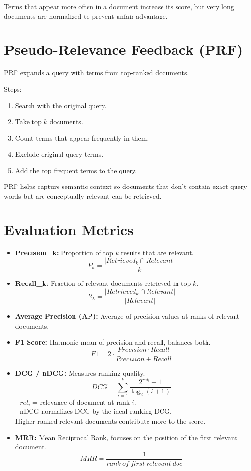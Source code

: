 \documentclass[a4paper,12pt]{article}
\begin{document}
Terms that appear more often in a document increase its score, but very long documents are normalized to prevent unfair advantage.

\section{Pseudo-Relevance Feedback (PRF)}
PRF expands a query with terms from top-ranked documents.

Steps:
\begin{enumerate}
    \item Search with the original query.
    \item Take top $k$ documents.
    \item Count terms that appear frequently in them.
    \item Exclude original query terms.
    \item Add the top frequent terms to the query.
\end{enumerate}

PRF helps capture semantic context so documents that don't contain exact query words but are conceptually relevant can be retrieved.

\section{Evaluation Metrics}
\begin{itemize}
    \item \textbf{Precision\_k:} Proportion of top $k$ results that are relevant.
    \[
    P_k = \frac{|Retrieved_k \cap Relevant|}{k}
    \]
    \item \textbf{Recall\_k:} Fraction of relevant documents retrieved in top $k$.
    \[
    R_k = \frac{|Retrieved_k \cap Relevant|}{|Relevant|}
    \]
    \item \textbf{Average Precision (AP):} Average of precision values at ranks of relevant documents.
    \item \textbf{F1 Score:} Harmonic mean of precision and recall, balances both.
    \[
    F1 = 2 \cdot \frac{Precision \cdot Recall}{Precision + Recall}
    \]
    \item \textbf{DCG / nDCG:} Measures ranking quality.
    \[
    DCG = \sum_{i=1}^k \frac{2^{rel_i}-1}{\log_2(i+1)}
    \]
    - $rel_i$ = relevance of document at rank $i$.  \\
    - nDCG normalizes DCG by the ideal ranking DCG.  \\
  Higher-ranked relevant documents contribute more to the score.
  
    \item \textbf{MRR:} Mean Reciprocal Rank, focuses on the position of the first relevant document.
    \[
    MRR = \frac{1}{rank\ of\ first\ relevant\ doc}
    \]
\end{itemize}
\end{document}
